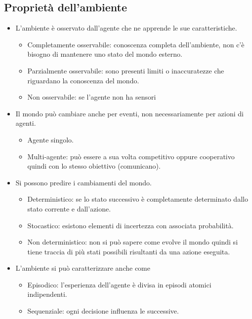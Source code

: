 \documentclass{article}
\begin{document}
\subsection{Proprietà dell'ambiente}
\begin{itemize}
    \item L'ambiente è osservato dall'agente che ne apprende le sue caratteristiche.
        \begin{itemize}
            \item Completamente osservabile: conoscenza completa dell'ambiente, non c'è bisogno di mantenere uno stato del mondo esterno.
            \item Parzialmente osservabile: sono presenti limiti o inaccuratezze che riguardano la conoscenza del mondo.
            \item Non osservabile: se l'agente non ha sensori
        \end{itemize}
    \item Il mondo può cambiare anche per eventi, non necessariamente per azioni di agenti.
        \begin{itemize}
            \item Agente singolo.
            \item Multi-agente: può essere a sua volta competitivo oppure cooperativo quindi con lo stesso obiettivo (comunicano).
        \end{itemize}
    \item Si possono predire i cambiamenti del mondo.
        \begin{itemize}
            \item Deterministico: se lo stato successivo è completamente determinato dallo stato corrente e dall'azione.
            \item Stocastico: esistono elementi di incertezza con associata probabilità.
            \item Non deterministico: non si può sapere come evolve il mondo quindi si tiene traccia di più stati possibili risultanti da una azione eseguita.
        \end{itemize}
    \item L'ambiente si può caratterizzare anche come 
        \begin{itemize}
            \item Episodico: l'esperienza dell'agente è divisa in episodi atomici indipendenti.
            \item Sequenziale: ogni decisione influenza le successive.
        \end{itemize}

\end{itemize}
\end{document}
